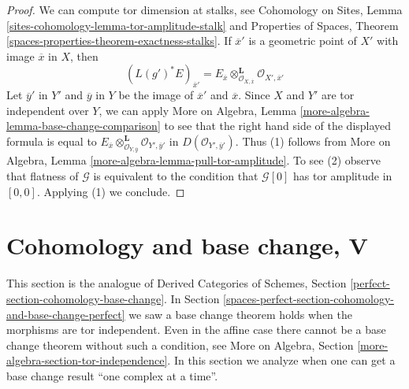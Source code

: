 \begin{proof}
We can compute tor dimension at stalks, see
Cohomology on Sites, Lemma \ref{sites-cohomology-lemma-tor-amplitude-stalk}
and Properties of Spaces, Theorem
\ref{spaces-properties-theorem-exactness-stalks}.
If $\overline{x}'$ is a geometric point of $X'$ with image
$\overline{x}$ in $X$, then
$$
(L(g')^*E)_{\overline{x}'} =
E_{\overline{x}}
\otimes_{\mathcal{O}_{X, \overline{x}}}^\mathbf{L}
\mathcal{O}_{X', \overline{x}'}
$$
Let $\overline{y}'$ in $Y'$ and $\overline{y}$ in $Y$
be the image of $\overline{x}'$ and $\overline{x}$.
Since $X$ and $Y'$ are tor independent over $Y$, we can apply
More on Algebra, Lemma \ref{more-algebra-lemma-base-change-comparison}
to see that the right hand side of the displayed formula is equal to
$E_{\overline{x}}
\otimes_{\mathcal{O}_{Y, \overline{y}}}^\mathbf{L}
\mathcal{O}_{Y', \overline{y}'}$
in $D(\mathcal{O}_{Y', \overline{y}'})$.
Thus (1) follows from
More on Algebra, Lemma \ref{more-algebra-lemma-pull-tor-amplitude}.
To see (2) observe that flatness of $\mathcal{G}$ is equivalent to
the condition that $\mathcal{G}[0]$ has tor amplitude in $[0, 0]$.
Applying (1) we conclude.
\end{proof}

\section{Cohomology and base change, V}
\label{spaces-perfect-section-cohomology-base-change}
This section is the analogue of Derived Categories of Schemes, Section
\ref{perfect-section-cohomology-base-change}. In
Section \ref{spaces-perfect-section-cohomology-and-base-change-perfect}
we saw a base change theorem holds when the morphisms are tor independent.
Even in the affine case there cannot be a base change theorem without such
a condition, see
More on Algebra, Section \ref{more-algebra-section-tor-independence}.
In this section we analyze when one can get a base change result
``one complex at a time''.

